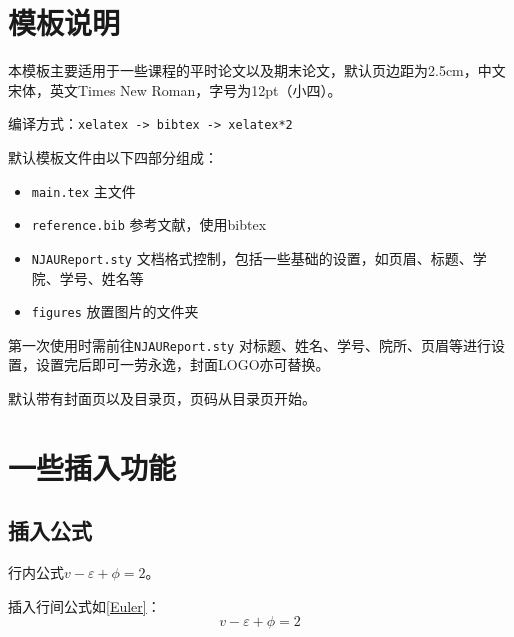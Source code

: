 \documentclass[12pt,hyperref,a4paper,UTF8,fontset=fandol]{ctexart}
\begin{document}
\cover

%
%

\thispagestyle{empty} %

\newpage
\tableofcontents

\newpage


\section{模板说明}
本模板主要适用于一些课程的平时论文以及期末论文，默认页边距为2.5cm，中文宋体，英文Times New Roman，字号为12pt（小四）。

编译方式：\verb|xelatex -> bibtex -> xelatex*2|


默认模板文件由以下四部分组成：
\begin{itemize}
    \item \texttt{main.tex} 主文件
    \item \texttt{reference.bib} 参考文献，使用bibtex
    \item \texttt{NJAUReport.sty} 文档格式控制，包括一些基础的设置，如页眉、标题、学院、学号、姓名等
    \item \texttt{figures} 放置图片的文件夹
\end{itemize}

第一次使用时需前往\texttt{NJAUReport.sty} 对标题、姓名、学号、院所、页眉等进行设置，设置完后即可一劳永逸，封面LOGO亦可替换。

默认带有封面页以及目录页，页码从目录页开始。

\section{一些插入功能}
\subsection{插入公式}
行内公式$v-\varepsilon+\phi=2$。

插入行间公式如\autoref{Euler}：
\begin{equation}
    v-\varepsilon+\phi=2
    \label{Euler}
\end{equation}
\end{document}

